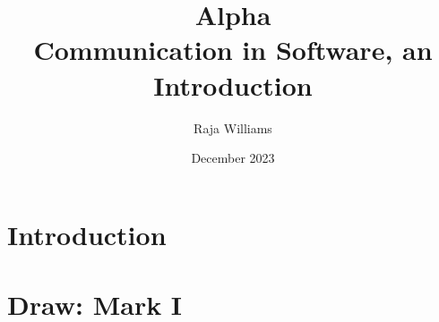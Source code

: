 \documentclass[twocolumn]{book}
\title{%
    Alpha \\
    \large Communication in Software, an Introduction
}
\author{Raja Williams}
\date{December 2023}
\begin{document}
\maketitle

\tableofcontents

\chapter{Introduction}


\chapter{Draw: Mark I}

\end{document}
